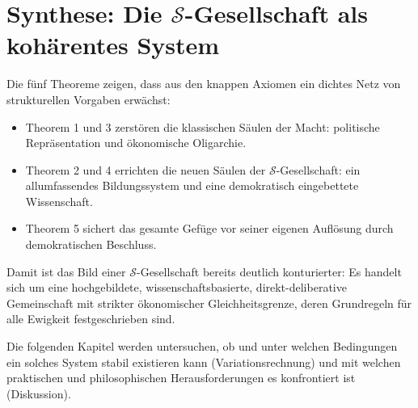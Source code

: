 \section{Synthese: Die $\mathcal{S}$-Gesellschaft als kohärentes System}

Die fünf Theoreme zeigen, dass aus den knappen Axiomen ein dichtes Netz von strukturellen Vorgaben erwächst:
\begin{itemize}
    \item Theorem 1 und 3 zerstören die klassischen Säulen der Macht: politische Repräsentation und ökonomische Oligarchie.
    \item Theorem 2 und 4 errichten die neuen Säulen der $\mathcal{S}$-Gesellschaft: ein allumfassendes Bildungssystem und eine demokratisch eingebettete Wissenschaft.
    \item Theorem 5 sichert das gesamte Gefüge vor seiner eigenen Auflösung durch demokratischen Beschluss.
\end{itemize}

Damit ist das Bild einer $\mathcal{S}$-Gesellschaft bereits deutlich konturierter: Es handelt sich um eine hochgebildete, wissenschaftsbasierte, direkt-deliberative Gemeinschaft mit strikter ökonomischer Gleichheitsgrenze, deren Grundregeln für alle Ewigkeit festgeschrieben sind.

Die folgenden Kapitel werden untersuchen, ob und unter welchen Bedingungen ein solches System stabil existieren kann (Variationsrechnung) und mit welchen praktischen und philosophischen Herausforderungen es konfrontiert ist (Diskussion).
